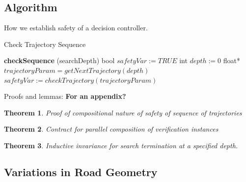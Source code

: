 \documentclass{easychair}
\theoremstyle{theorem}
\newtheorem{theorem}{Theorem}
\theoremstyle{remark}
\begin{document}
\subsection{Algorithm}
How we establish safety of a decision controller.
\begin{algorithm}
	\caption{Check Trajectory Sequence}
	\label{algo:trajseq}
	\begin{algorithmic}
		\State \textbf{checkSequence} (searchDepth)
		\State  bool $safetyVar := TRUE$
		\State int $depth := 0$
		\State float* $trajectoryParam = getNextTrajectory(depth)$
		\State $safetyVar := checkTrajectory(trajectoryParam)$
		\State
		\EndWhile
		\State {}
	\end{algorithmic}
\end{algorithm}
Proofs and lemmas:
\textbf{For an appendix?}
\begin{theorem}
	Proof of compositional nature of safety of sequence of trajectories
\end{theorem}

\begin{theorem}
	Contract for parallel composition of verification instances
\end{theorem}

\begin{theorem}
	Inductive invariance for search termination at a specified depth. 
\end{theorem}


\subsection{Variations in Road Geometry}
\end{document}
